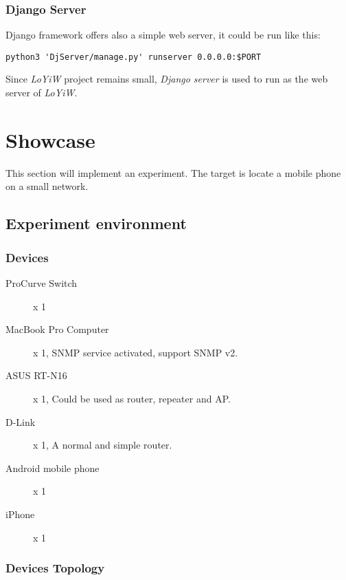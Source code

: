 \subsubsection{Django Server}
Django framework offers also a simple web server, it could be run like this:

\begin{lstlisting}[caption={Sample of run Django server, see \textit{LoYiW/shells/mac.sh} for more details.}]
python3 'DjServer/manage.py' runserver 0.0.0.0:$PORT
\end{lstlisting}

Since \textit{LoYiW} project remains small, \textit{Django server} is used to run as the web server of \textit{LoYiW}.

\section{Showcase}

This section will implement an experiment. The target is locate a mobile phone on a small network.

\subsection{Experiment environment}
\subsubsection{Devices}
\begin{description}
	\item[ProCurve Switch] x 1
	\item[MacBook Pro Computer] x 1, SNMP service activated, support SNMP v2.
	\item[ASUS RT-N16] x 1, Could be used as router, repeater and AP.
	\item[D-Link] x 1, A normal and simple router.
\end{description}

\begin{description}
	\item[Android mobile phone] x 1
	\item[iPhone] x 1
\end{description}

\subsubsection{Devices Topology}


